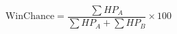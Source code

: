 \documentclass{article}
\begin{document}
\[  \text{WinChance} = \frac{\sum HP_A}{\sum HP_A + \sum HP_B} \times 100
\]
\pagebreak
\end{document}
